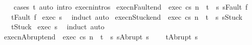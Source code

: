 \begin{isabellebody}
%
\isadelimproof
\ \ %
\endisadelimproof
%
\isatagproof
{}\isamarkupfalse%
\ {\isacharparenleft}cases\ t{\isacharparenright}\ {\isacharparenleft}auto\ intro{\isacharcolon}\ execn{\isachardot}intros{\isacharparenright}%
\endisatagproof
{\isafoldproof}%
%
\isadelimproof
\isanewline
%
\endisadelimproof
\isanewline
{}\isamarkupfalse%
\ execn{\isacharunderscore}Fault{\isacharunderscore}end{\isacharcolon}\ \ exec{\isacharcolon}\ {\isachardoublequoteopen}{\isasymGamma}{\isasymturnstile}{\isasymlangle}c{\isacharcomma}s{\isasymrangle}\ {\isacharequal}n{\isasymRightarrow}\ \ t{\isachardoublequoteclose}\ \ s{\isacharcolon}\ {\isachardoublequoteopen}s{\isacharequal}Fault\ f{\isachardoublequoteclose}\ \isanewline
\ \ \ {\isachardoublequoteopen}t{\isacharequal}Fault\ f{\isachardoublequoteclose}\isanewline
%
\isadelimproof
%
\endisadelimproof
%
\isatagproof
{}\isamarkupfalse%
\ exec\ s\ \isamarkupfalse%
\ {\isacharparenleft}induct{\isacharparenright}\ auto%
\endisatagproof
{\isafoldproof}%
%
\isadelimproof
\isanewline
%
\endisadelimproof
\isanewline
{}\isamarkupfalse%
\ execn{\isacharunderscore}Stuck{\isacharunderscore}end{\isacharcolon}\ \ exec{\isacharcolon}\ {\isachardoublequoteopen}{\isasymGamma}{\isasymturnstile}{\isasymlangle}c{\isacharcomma}s{\isasymrangle}\ {\isacharequal}n{\isasymRightarrow}\ \ t{\isachardoublequoteclose}\ \ s{\isacharcolon}\ {\isachardoublequoteopen}s{\isacharequal}Stuck{\isachardoublequoteclose}\ \isanewline
\ \ \ {\isachardoublequoteopen}t{\isacharequal}Stuck{\isachardoublequoteclose}\isanewline
%
\isadelimproof
%
\endisadelimproof
%
\isatagproof
{}\isamarkupfalse%
\ exec\ s\ \isamarkupfalse%
\ {\isacharparenleft}induct{\isacharparenright}\ auto%
\endisatagproof
{\isafoldproof}%
%
\isadelimproof
\isanewline
%
\endisadelimproof
\isanewline
{}\isamarkupfalse%
\ execn{\isacharunderscore}Abrupt{\isacharunderscore}end{\isacharcolon}\ \ exec{\isacharcolon}\ {\isachardoublequoteopen}{\isasymGamma}{\isasymturnstile}{\isasymlangle}c{\isacharcomma}s{\isasymrangle}\ {\isacharequal}n{\isasymRightarrow}\ \ t{\isachardoublequoteclose}\ \ s{\isacharcolon}\ {\isachardoublequoteopen}s{\isacharequal}Abrupt\ s{\isacharprime}{\isachardoublequoteclose}\ \isanewline
\ \ \ {\isachardoublequoteopen}t{\isacharequal}Abrupt\ s{\isacharprime}{\isachardoublequoteclose}\isanewline
%
\isadelimproof

\end{isabellebody}
